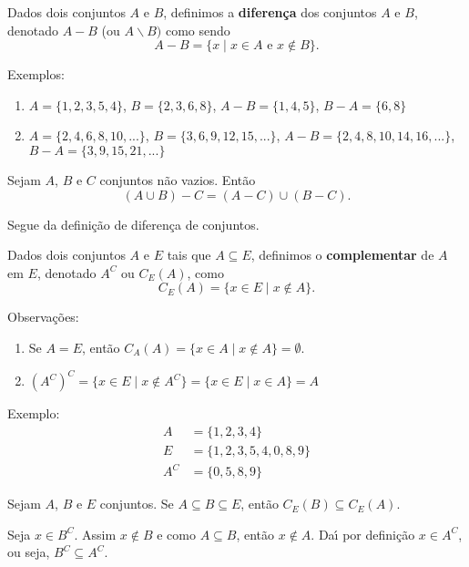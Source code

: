 \begin{definicao}
Dados dois conjuntos $A$ e $B$, definimos a \textbf{diferen{\c c}a} dos conjuntos $A$ e $B$, denotado $A-B$ (ou $A\backslash B)$ como sendo
\[
A - B = \{x \mid x \in A \mbox{ e } x \notin B\}.
\]
\end{definicao}

Exemplos:
\begin{enumerate}
\item $A=\{1,2,3,5,4\}$, $B=\{2,3,6,8\}$, $A-B=\{1,4,5\}$, $B-A=\{6,8\}$
\item $A=\{2,4,6,8,10,...\}$,  $B=\{3,6,9,12,15,...\}$, $A-B=\{2,4,8,10,14,16,...\}$, $B - A=\{3,9,15,21,...\}$
\end{enumerate}

\begin{proposicao}
	Sejam $A$, $B$ e $C$ conjuntos n\~ao vazios. Ent\~ao
	\[(A \cup B) - C = (A - C) \cup (B - C).\]
\end{proposicao}
\begin{prova}
	Segue da defini\c{c}\~ao de diferen\c{c}a de conjuntos.
\end{prova}

\begin{definicao}[Complementar]
Dados dois conjuntos $A$ e $E$ tais que $A\subseteq E$, definimos o \textbf{complementar} de $A$ em $E$, denotado $A^C$ ou $C_E(A)$, como
\[
	C_E(A) = \{ x \in E \mid x \notin A \}.
\]
\end{definicao}

Observa{\c c}{\~o}es:
\begin{enumerate}
\item Se $A = E$, ent{\~a}o $C_A(A) = \{ x \in A \mid x \notin A \} = \emptyset$.
\item $(A^C)^C = \{x \in E \mid x \notin A^C\} = \{ x \in E \mid x \in A \} = A$
\end{enumerate}

Exemplo:
\begin{align*}
	A &= \{1,2,3,4\}\\
	E &= \{1,2,3,5,4,0,8,9\}\\
	A^C &= \{0,5,8,9\}
\end{align*}

\begin{proposicao}
	Sejam $A$, $B$ e $E$ conjuntos. Se $A\subseteq B\subseteq E$, ent{\~a}o $C_E(B)\subseteq C_E(A)$.
\end{proposicao}
\begin{prova}
	Seja $x \in B^C$. Assim $x\notin B$ e como $A \subseteq B$, ent\~ao $x \notin A$. Da{\'\i} por defini\c{c}\~ao $x\in A^C$, ou seja, $B^C\subseteq A^C$.
\end{prova}

